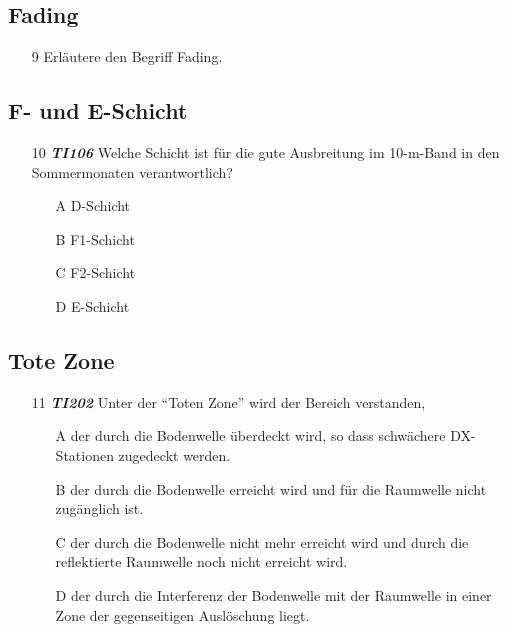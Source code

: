 \subsection*{Fading}

\begin{enumerate} 
\itemsep1pt\parskip0pt
\item[9] Erläutere den Begriff Fading.
\end{enumerate}

\subsection*{F- und E-Schicht}

\begin{enumerate} 
\itemsep1pt\parskip0pt
\item[10] \emph{\textbf{TI106}}   Welche Schicht ist für die gute Ausbreitung im 10-m-Band in den Sommermonaten verantwortlich?
	\begin{enumerate}
	\itemsep1pt\parskip0pt
		\item[A] D-Schicht
		\item[B] F1-Schicht
		\item[C] F2-Schicht
		\item[D] E-Schicht
	\end{enumerate}
\end{enumerate}


\subsection*{Tote Zone}

\begin{enumerate} 
\itemsep1pt\parskip0pt
\item[11] \emph{\textbf{TI202}}   Unter der ``Toten Zone'' wird der Bereich verstanden,
	\begin{enumerate}
	\itemsep1pt\parskip0pt
		\item[A] der durch die Bodenwelle überdeckt wird, so dass schwächere DX-Stationen zugedeckt werden.
		\item[B] der durch die Bodenwelle erreicht wird und für die Raumwelle nicht zugänglich ist.
		\item[C] der durch die Bodenwelle nicht mehr erreicht wird und durch die reflektierte Raumwelle noch nicht erreicht wird.
		\item[D] der durch die Interferenz der Bodenwelle mit der Raumwelle in einer Zone der gegenseitigen Auslöschung liegt.
	\end{enumerate}
\end{enumerate}

